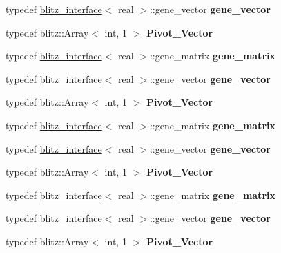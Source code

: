 \begin{DoxyCompactItemize}
typedef \hyperlink{classblitz__interface}{blitz\+\_\+interface}$<$ real $>$\+::gene\+\_\+vector {\bfseries gene\+\_\+vector}
\item 
\mbox{\label{classblitz___l_u__solve__interface_a29fb02ff26df347be16bda17d851b47f}} 
typedef blitz\+::\+Array$<$ int, 1 $>$ {\bfseries Pivot\+\_\+\+Vector}
\item 
\mbox{\label{classblitz___l_u__solve__interface_a9cca961da94b2f5ab7c4153d90e6ed00}} 
typedef \hyperlink{classblitz__interface}{blitz\+\_\+interface}$<$ real $>$\+::gene\+\_\+matrix {\bfseries gene\+\_\+matrix}
\item 
\mbox{\label{classblitz___l_u__solve__interface_ac862c1169c7df1756379a78763594345}} 
typedef \hyperlink{classblitz__interface}{blitz\+\_\+interface}$<$ real $>$\+::gene\+\_\+vector {\bfseries gene\+\_\+vector}
\item 
\mbox{\label{classblitz___l_u__solve__interface_a29fb02ff26df347be16bda17d851b47f}} 
typedef blitz\+::\+Array$<$ int, 1 $>$ {\bfseries Pivot\+\_\+\+Vector}
\item 
\mbox{\label{classblitz___l_u__solve__interface_a9cca961da94b2f5ab7c4153d90e6ed00}} 
typedef \hyperlink{classblitz__interface}{blitz\+\_\+interface}$<$ real $>$\+::gene\+\_\+matrix {\bfseries gene\+\_\+matrix}
\item 
\mbox{\label{classblitz___l_u__solve__interface_ac862c1169c7df1756379a78763594345}} 
typedef \hyperlink{classblitz__interface}{blitz\+\_\+interface}$<$ real $>$\+::gene\+\_\+vector {\bfseries gene\+\_\+vector}
\item 
\mbox{\label{classblitz___l_u__solve__interface_a29fb02ff26df347be16bda17d851b47f}} 
typedef blitz\+::\+Array$<$ int, 1 $>$ {\bfseries Pivot\+\_\+\+Vector}
\item 
\mbox{\label{classblitz___l_u__solve__interface_a9cca961da94b2f5ab7c4153d90e6ed00}} 
typedef \hyperlink{classblitz__interface}{blitz\+\_\+interface}$<$ real $>$\+::gene\+\_\+matrix {\bfseries gene\+\_\+matrix}
\item 
\mbox{\label{classblitz___l_u__solve__interface_ac862c1169c7df1756379a78763594345}} 
typedef \hyperlink{classblitz__interface}{blitz\+\_\+interface}$<$ real $>$\+::gene\+\_\+vector {\bfseries gene\+\_\+vector}
\item 
\mbox{\label{classblitz___l_u__solve__interface_a29fb02ff26df347be16bda17d851b47f}} 
typedef blitz\+::\+Array$<$ int, 1 $>$ {\bfseries Pivot\+\_\+\+Vector}
\end{DoxyCompactItemize}
